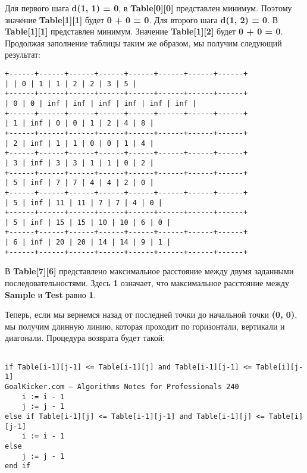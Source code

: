 Для первого шага \textbf{d(1, 1) = 0}, в \textbf{Table[0][0]} представлен минимум. Поэтому значение \textbf{Table[1][1]} будет \textbf{0 + 0 = 0}. Для второго шага \textbf{d(1, 2) = 0}. В \textbf{Table[1][1]} представлен минимум. Значение \textbf{Table[1][2]} будет \textbf{0 + 0 = 0}. Продолжая заполнение таблицы таким же образом, мы получим следующий результат:

\vspace{\baselineskip}
\begin{tcolorbox}
\begin{verbatim}
+------+------+------+------+------+------+------+------+
| | 0 | 1 | 1 | 2 | 2 | 3 | 5 |
+------+------+------+------+------+------+------+------+
| 0 | 0 | inf | inf | inf | inf | inf | inf |
+------+------+------+------+------+------+------+------+
| 1 | inf | 0 | 0 | 1 | 2 | 4 | 8 |
+------+------+------+------+------+------+------+------+
| 2 | inf | 1 | 1 | 0 | 0 | 1 | 4 |
+------+------+------+------+------+------+------+------+
| 3 | inf | 3 | 3 | 1 | 1 | 0 | 2 |
+------+------+------+------+------+------+------+------+
| 5 | inf | 7 | 7 | 4 | 4 | 2 | 0 |
+------+------+------+------+------+------+------+------+
| 5 | inf | 11 | 11 | 7 | 7 | 4 | 0 |
+------+------+------+------+------+------+------+------+
| 5 | inf | 15 | 15 | 10 | 10 | 6 | 0 |
+------+------+------+------+------+------+------+------+
| 6 | inf | 20 | 20 | 14 | 14 | 9 | 1 |
+------+------+------+------+------+------+------+------+
\end{verbatim}
\end{tcolorbox}

\vspace{\baselineskip}
\vspace{-0.2cm}
В \textbf{Table[7][6]} представлено максимальное расстояние между двумя заданными последовательностями. Здесь \textbf{1} означает, что максимальное расстояние между \textbf{Sample} и \textbf{Test} равно \textbf{1}.

\vspace{\baselineskip}
Теперь, если мы вернемся назад от последней точки до начальной точки \textbf{(0, 0)}, мы получим длинную линию, которая проходит по горизонтали, вертикали и диагонали. Процедура возврата будет такой:

\vspace{\baselineskip}
\begin{tcolorbox}
\begin{verbatim}

if Table[i-1][j-1] <= Table[i-1][j] and Table[i-1][j-1] <= Table[i][j-1]
GoalKicker.com – Algorithms Notes for Professionals 240
    i := i - 1
    j := j - 1
else if Table[i-1][j] <= Table[i-1][j-1] and Table[i-1][j] <= Table[i][j-1]
    i := i - 1
else
    j := j - 1
end if

\end{verbatim}
\end{tcolorbox}

